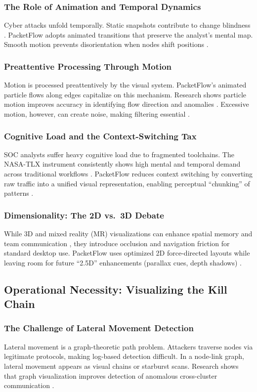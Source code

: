 \documentclass[
    11pt, 
    a4paper, 
    parskip=half, 
    headsepline,       %
    DIV=12             %
]{scrartcl}
\begin{document}
\subsubsection{The Role of Animation and Temporal Dynamics}
Cyber attacks unfold temporally. Static snapshots contribute to change blindness \cite{ref9}. PacketFlow adopts animated transitions that preserve the analyst’s mental map. Smooth motion prevents disorientation when nodes shift positions \cite{ref10}.

\subsubsection{Preattentive Processing Through Motion}
Motion is processed preattentively by the visual system. PacketFlow’s animated particle flows along edges capitalize on this mechanism. Research shows particle motion improves accuracy in identifying flow direction and anomalies \cite{ref12}. Excessive motion, however, can create noise, making filtering essential \cite{ref14}.

\subsubsection{Cognitive Load and the Context-Switching Tax}
SOC analysts suffer heavy cognitive load due to fragmented toolchains. The NASA-TLX instrument consistently shows high mental and temporal demand across traditional workflows \cite{ref15}. PacketFlow reduces context switching by converting raw traffic into a unified visual representation, enabling perceptual ``chunking'' of patterns \cite{ref18}.

\subsubsection{Dimensionality: The 2D vs.\ 3D Debate}
While 3D and mixed reality (MR) visualizations can enhance spatial memory and team communication \cite{ref21}, they introduce occlusion and navigation friction for standard desktop use. PacketFlow uses optimized 2D force-directed layouts while leaving room for future ``2.5D'' enhancements (parallax cues, depth shadows) \cite{ref23}.

\subsection{Operational Necessity: Visualizing the Kill Chain}

\subsubsection{The Challenge of Lateral Movement Detection}
Lateral movement is a graph-theoretic path problem. Attackers traverse nodes via legitimate protocols, making log-based detection difficult. In a node-link graph, lateral movement appears as visual chains or starburst scans. Research shows that graph visualization improves detection of anomalous cross-cluster communication \cite{ref28}.
\end{document}
